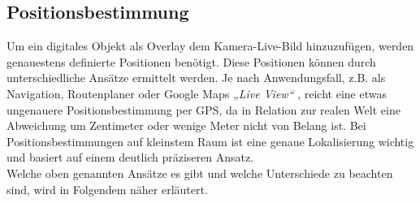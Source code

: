 \subsection{Positionsbestimmung}
\label{sec:posi}
Um ein digitales Objekt als Overlay dem Kamera-Live-Bild hinzuzufügen, werden genauestens definierte Positionen benötigt. Diese Positionen 
können durch unterschiedliche Ansätze ermittelt werden. Je nach Anwendungsfall, z.B. als Navigation, Routenplaner oder Google Maps 
\textit{„Live View“} \cite{googleliveview.2019a}, reicht eine etwas ungenauere Positionsbestimmung per \acs{GPS}, da in Relation zur 
realen Welt eine Abweichung um Zentimeter oder wenige Meter nicht von Belang ist. Bei Positionsbestimmungen auf kleinstem Raum ist eine 
genaue Lokalisierung wichtig und basiert auf einem deutlich präziseren Ansatz. 
\\ 
Welche oben genannten Ansätze es gibt und welche Unterschiede zu beachten sind, wird in Folgendem näher erläutert. 
